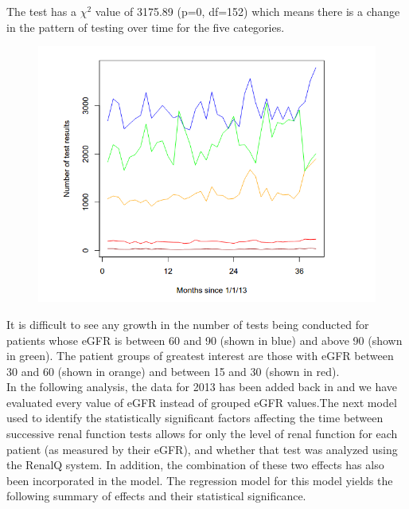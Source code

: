 \documentclass[11pt]{article}
\begin{document}
The test has a $\chi^2$ value of 3175.89 (p=0, df=152) which means there is a change in the pattern of testing over time for the five categories.\\

\begin{figure}[htp]
\centering
\includegraphics[scale=0.50]{fig6.png}
\caption{}
\label{}
\end{figure}

It is difficult to see any growth in the number of tests being conducted for patients whose eGFR is between 60 and 90 (shown in blue) and above 90 (shown in green). The patient groups of greatest interest are those with eGFR between 30 and 60 (shown in orange) and between 15 and 30 (shown in red).\\

In the following analysis, the data for 2013 has been added back in and we have evaluated every value of eGFR instead of grouped eGFR values.The next  model  used to identify the statistically significant factors affecting the time between successive renal function tests allows for only the level of renal function for each patient (as measured by their eGFR), and whether that test was analyzed using the RenalQ system. In addition, the combination of these two effects has also been incorporated in the model. The regression model for this model yields  the following summary of effects and their statistical significance. \\
\end{document}
